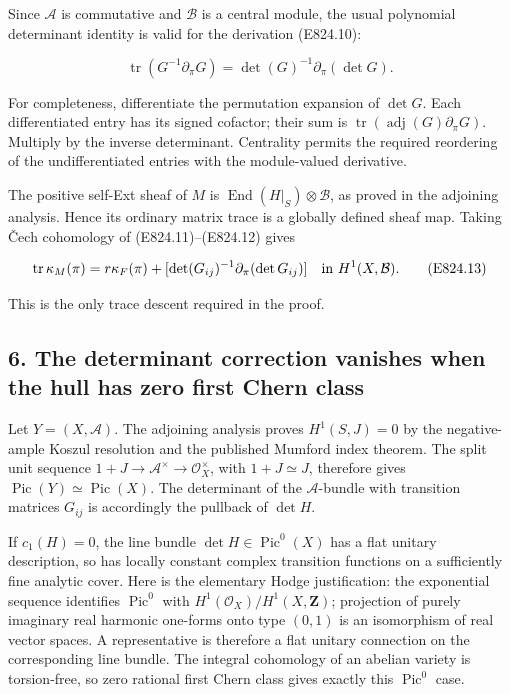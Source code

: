 Since \(\mathcal A\) is commutative and \(\mathcal B\) is a central
module, the usual polynomial determinant identity is valid for the
derivation (E824.10):

\[
 \operatorname{tr}(G^{-1}\partial_\pi G)
       =\det(G)^{-1}\partial_\pi(\det G).
 \tag{E824.12}
\]

For completeness, differentiate the permutation expansion of \(\det G\).
Each differentiated entry has its signed cofactor; their sum is
\(\operatorname{tr}(\operatorname{adj}(G)\partial_\pi G)\). Multiply by
the inverse determinant. Centrality permits the required reordering of
the undifferentiated entries with the module-valued derivative.

The positive self-Ext sheaf of \(M\) is
\(\operatorname{End}(H|_S)\otimes\mathcal B\), as proved in the
adjoining analysis. Hence its ordinary matrix trace is a globally
defined sheaf map. Taking Čech cohomology of (E824.11)--(E824.12) gives

\[
 \operatorname{tr}\kappa_M(\pi)
     =r\kappa_F(\pi)
       +[\det(G_{ij})^{-1}\partial_\pi(\det G_{ij})]
       \quad\hbox{in }H^1(X,\mathcal B).
 \tag{E824.13}
\]

This is the only trace descent required in the proof.

\subsection{6. The determinant correction vanishes when the hull has
zero first Chern
class}\label{SF-E824-the-determinant-correction-vanishes-when-the-hull-has-zero-first-chern-class}

Let \(Y=(X,\mathcal A)\). The adjoining analysis proves \(H^1(S,J)=0\)
by the negative-ample Koszul resolution and the published Mumford index
theorem. The split unit sequence
\(1+J\to\mathcal A^\times\to\mathcal O_X^\times\), with \(1+J\simeq J\),
therefore gives \(\operatorname{Pic}(Y)\simeq\operatorname{Pic}(X)\).
The determinant of the \(\mathcal A\)-bundle with transition matrices
\(G_{ij}\) is accordingly the pullback of \(\det H\).

If \(c_1(H)=0\), the line bundle \(\det H\in\operatorname{Pic}^0(X)\)
has a flat unitary description, so has locally constant complex
transition functions on a sufficiently fine analytic cover. Here is the
elementary Hodge justification: the exponential sequence identifies
\(\operatorname{Pic}^0\) with \(H^1(\mathcal O_X)/H^1(X,\mathbf Z)\);
projection of purely imaginary real harmonic one-forms onto type
\((0,1)\) is an isomorphism of real vector spaces. A representative is
therefore a flat unitary connection on the corresponding line bundle.
The integral cohomology of an abelian variety is torsion-free, so zero
rational first Chern class gives exactly this \(\operatorname{Pic}^0\)
case.

